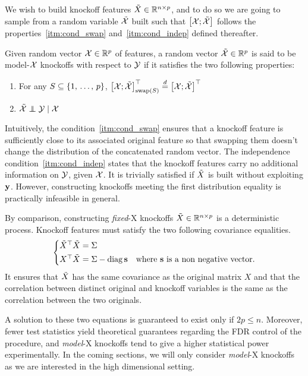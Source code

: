 We wish to build knockoff features $\tilde{X} \in \mathbb{R}^{n \times p}$,
and to do so we are going to sample from a
random variable $\tilde{\mathcal{X}}$ built such that $\big[ \mathcal{X}; \tilde{\mathcal{X}} \big]$
follows the properties~\ref{itm:cond_swap} and~\ref{itm:cond_indep} defined thereafter.
\begin{definition}
    Given random vector $\mathcal{X} \in \mathbb{R}^p$ of features,
    a random vector $\tilde{\mathcal{X}} \in \mathbb{R}^p$ is said to be model-$\mathcal{X}$ knockoffs with respect to $\mathcal{Y}$
    if it satisfies the two following properties:
    \begin{enumerate}[label=\textbf{S.\arabic*},ref=S.\arabic*]
        \item \label{itm:cond_swap} For any $S \subseteq \left\{ 1,\, \dots,\, p \right\}$,
            $\big[ \mathcal{X}; \tilde{\mathcal{X}} \big]^\top_{\operatorname{swap}(S)} \stackrel{d}{=} \big[ \mathcal{X}; \tilde{\mathcal{X}} \big]^\top$
        \item \label{itm:cond_indep} $\tcX \independent \cY \mid \cX$
    \end{enumerate}
\end{definition}
Intuitively, the condition~\ref{itm:cond_swap} ensures that a knockoff feature is sufficiently
close to its associated original feature so that swapping them doesn't change the distribution of the
concatenated random vector.
The independence condition~\ref{itm:cond_indep} states that the knockoff features
carry no additional information on $\mathcal{Y}$, given $\mathcal{X}$.
It is trivially satisfied if $\tilde{X}$ is built without exploiting $\mathbf{y}$.
However, constructing knockoffs meeting the first distribution equality is practically infeasible in general.
\begin{remark}
    By comparison, constructing \textit{fixed}-X knockoffs $\tilde{X} \in \mathbb{R}^{n \times p}$ is a deterministic process.
    Knockoff features must satisfy the two following covariance equalities.
    \begin{equation*}
        \begin{cases*}
            \tX^\top \tX = \Sigma\\
            X^\top \tX = \Sigma - \diag\bs
                \quad\text{where } \bs \text{ is a non negative vector.}
        \end{cases*}
    \end{equation*}
    It ensures that $\tilde{X}$ has the same covariance as the original matrix $X$
    and that the correlation between distinct original and knockoff variables is
    the same as the correlation between the two originals.

    A solution to these two equations is guaranteed to exist only if $2p \leq n$.
    Moreover, fewer test statistics yield theoretical guarantees regarding the FDR control
    of the procedure,
    and \textit{model}-X knockoffs tend to give a higher statistical power experimentally.
    In the coming sections,
    we will only consider \textit{model}-X knockoffs as we are interested in the high dimensional setting.
\end{remark}

